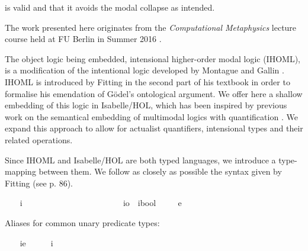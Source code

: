 \begin{isabellebody}
\begin{isamarkuptext}
is valid and that it avoids the modal collapse as intended.%
\end{isamarkuptext}\isamarkuptrue%
%
\begin{isamarkuptext}%
The work presented here originates from the \emph{Computational Metaphysics} lecture course  
held at FU Berlin in Summer 2016 \cite{C65}. \pagebreak%
\end{isamarkuptext}\isamarkuptrue%
%
\isamarkuptrue%
%
\begin{isamarkuptext}%
The object logic being embedded, intensional higher-order modal logic (IHOML), is a modification of the intentional logic developed by Montague
and Gallin \cite{Gallin75}. IHOML is introduced by Fitting in the second part of his textbook \cite{Fitting}
in order to formalise his emendation of G\"odel's ontological argument. We offer here a shallow embedding
of this logic in Isabelle/HOL, which has been inspired by previous work on the semantical embedding of
multimodal logics with quantification \cite{J23}. We expand this approach to allow for actualist quantifiers,
intensional types and their related operations.%
\end{isamarkuptext}\isamarkuptrue%
%
\isamarkuptrue%
%
\begin{isamarkuptext}%
Since IHOML and Isabelle/HOL are both typed languages, we introduce a type-mapping between them.
We follow as closely as possible the syntax given by Fitting (see p. 86).%
\end{isamarkuptext}\isamarkuptrue%
\ \ \isamarkupfalse%
\ i\ \ \ \ \ \ \ \ \ \ \ \ \ \ \ \ \ \ \ \ %
\isanewline
\ \ \isamarkupfalse%
\ io\ {\isacharequal}\ {\isachardoublequoteopen}{\isacharparenleft}i{\isasymRightarrow}bool{\isacharparenright}{\isachardoublequoteclose}\ %
\isanewline
\ \ \isamarkupfalse%
\ e\ \ {\isacharparenleft}{\isachardoublequoteopen}{\isasymzero}{\isachardoublequoteclose}{\isacharparenright}\ \ \ \ \ \ \ \ \ \ \ \ \ %
%
\begin{isamarkuptext}%
Aliases for common unary predicate types:%
\end{isamarkuptext}\isamarkuptrue%
\ \ \isamarkupfalse%
\ ie\ {\isacharequal}\ \ \ \ \ {\isachardoublequoteopen}{\isacharparenleft}i{\isasymRightarrow}{\isasymzero}{\isacharparenright}{\isachardoublequoteclose}\ \ \ \ \ \ \ \ \ \ \ \ \ {\isacharparenleft}{\isachardoublequoteopen}{\isasymup}{\isasymzero}{\isachardoublequoteclose}{\isacharparenright}\isanewline

\end{isabellebody}
